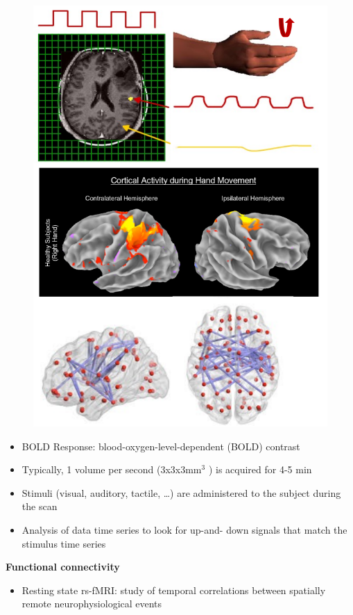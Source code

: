 \begin{figure}[ht]
	\centering
	\includegraphics[width=0.8\linewidth]{figure_med/fmri}
\end{figure}
\FloatBarrier

\begin{itemize}
	\item BOLD Response: blood-oxygen-level-dependent (BOLD) contrast
	\item Typically, 1 volume per second (3x3x3mm$^3$ ) is
	acquired for 4-5 min
	\item Stimuli (visual, auditory, tactile, …) are
	administered to the subject during the scan
	\item Analysis of data time series to look for up-and-
	down signals that match the stimulus time
	series
\end{itemize}

\textbf{Functional connectivity}

\begin{itemize}
	\item Resting state rs-fMRI: study of temporal correlations between spatially remote neurophysiological events
\end{itemize}

